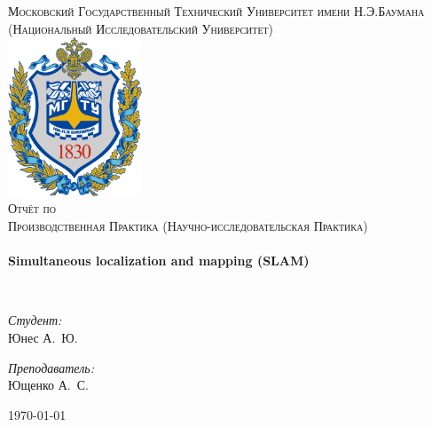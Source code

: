\begin{titlepage}
\begin{center}

\textsc{\Large Московский Государственный Технический Университет имени Н.Э.Баумана}\\
\textsc{\large (Национальный Исследовательский Университет)}\\[1.5cm]

\includegraphics[width=0.3\textwidth]{img/logo.png}~\\[1cm]

\textsc{\Large Отчёт по \\ Производственная Практика (Научно-исследовательская Практика) }\\[0.5cm]

\HRule \\[0.4cm]
{ \LARGE \bfseries Simultaneous localization and mapping (SLAM) \\[0.4cm] }

\HRule \\[1.5cm]

\noindent
\begin{minipage}{0.4\textwidth}
\begin{flushleft} \large
\emph{Студент:}\\
Юнес \textsc{А.~Ю.}
\end{flushleft}
\end{minipage}%
\begin{minipage}{0.4\textwidth}
\begin{flushright} \large
\emph{Преподаватель:} \\
Ющенко \textsc{А.~С.}
\end{flushright}
\end{minipage}

\vfill

{\large \today}

\end{center}
\end{titlepage}